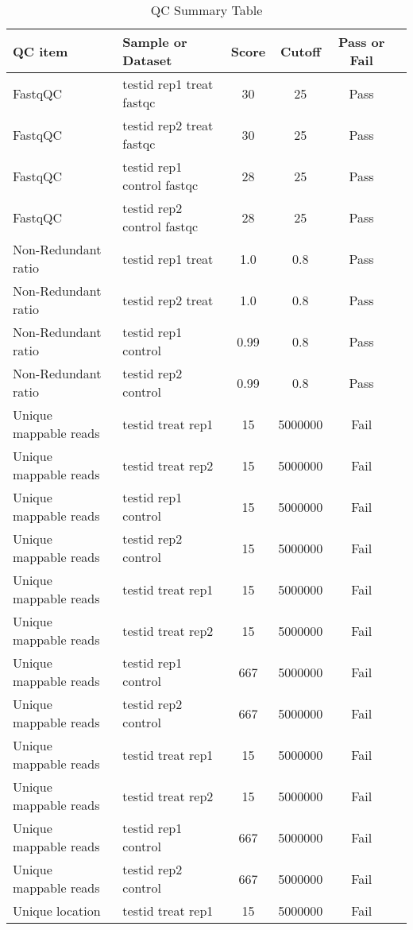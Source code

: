 \documentclass[11pt,a4paper]{article}
\begin{document}
\begin{table}[h]
\caption{QC Summary Table}\label{summarytable}
\begin{tabularx}{\textwidth}{ |X|X|c|c|c|c| } 
\hline
QC item & Sample or Dataset & Score & Cutoff & Pass or Fail \\
\hline
FastqQC & testid rep1 treat fastqc & 30 & 25 & Pass \\
\hline
FastqQC & testid rep2 treat fastqc & 30 & 25 & Pass \\
\hline
FastqQC & testid rep1 control fastqc & 28 & 25 & Pass \\
\hline
FastqQC & testid rep2 control fastqc & 28 & 25 & Pass \\
\hline
Non-Redundant ratio & testid rep1 treat & 1.0 & 0.8 & Pass \\
\hline
Non-Redundant ratio & testid rep2 treat & 1.0 & 0.8 & Pass \\
\hline
Non-Redundant ratio & testid rep1 control & 0.99 & 0.8 & Pass \\
\hline
Non-Redundant ratio & testid rep2 control & 0.99 & 0.8 & Pass \\
\hline
Unique mappable reads & testid treat rep1 & 15 & 5000000 & Fail \\
\hline
Unique mappable reads & testid treat rep2 & 15 & 5000000 & Fail \\
\hline
Unique mappable reads & testid rep1 control & 15 & 5000000 & Fail \\
\hline
Unique mappable reads & testid rep2 control & 15 & 5000000 & Fail \\
\hline
Unique mappable reads & testid treat rep1 & 15 & 5000000 & Fail \\
\hline
Unique mappable reads & testid treat rep2 & 15 & 5000000 & Fail \\
\hline
Unique mappable reads & testid rep1 control & 667 & 5000000 & Fail \\
\hline
Unique mappable reads & testid rep2 control & 667 & 5000000 & Fail \\
\hline
Unique mappable reads & testid treat rep1 & 15 & 5000000 & Fail \\
\hline
Unique mappable reads & testid treat rep2 & 15 & 5000000 & Fail \\
\hline
Unique mappable reads & testid rep1 control & 667 & 5000000 & Fail \\
\hline
Unique mappable reads & testid rep2 control & 667 & 5000000 & Fail \\
\hline
Unique location & testid treat rep1 & 15 & 5000000 & Fail \\

\end{tabularx}
\end{table}
\end{document}
